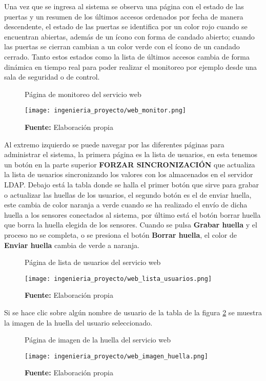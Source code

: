 \documentclass[../principal]{subfiles}
\begin{document}
  Una vez que se ingresa al sistema se observa una página con el estado de las puertas y un resumen de los últimos accesos ordenados por fecha de manera descendente, el estado de las puertas se identifica por un color rojo cuando se encuentran abiertas, además de un ícono con forma de candado abierto; cuando las puertas se cierran cambian a un color verde con el ícono de un candado cerrado. Tanto estos estados como la lista de últimos accesos cambia de forma dinámica en tiempo real para poder realizar el monitoreo por ejemplo desde una sala de seguridad o de control.

  \begin{figure}[H]
    \centering
    \caption{Página de monitoreo del servicio web}
    \texttt{[image: ingenieria\_proyecto/web\_monitor.png]}
    \caption*{\textbf{Fuente:} Elaboración propia}
    \label{fig:web_monitor}
  \end{figure}

  Al extremo izquierdo se puede navegar por las diferentes páginas para administrar el sistema, la primera página es la lista de usuarios, en esta tenemos un botón en la parte superior \textbf{FORZAR SINCRONIZACIÓN} que actualiza la lista de usuarios sincronizando los valores con los almacenados en el servidor LDAP. Debajo está la tabla donde se halla el primer botón que sirve para grabar o actualizar las huellas de los usuarios, el segundo botón es el de enviar huella, este cambia de color naranja a verde cuando se ha realizado el envío de dicha huella a los sensores conectados al sistema, por último está el botón borrar huella que borra la huella elegida de los sensores. Cuando se pulsa \textbf{Grabar huella} y el proceso no se completa, o se presiona el botón \textbf{Borrar huella}, el color de \textbf{Enviar huella} cambia de verde a naranja.

  \begin{figure}[H]
    \centering
    \caption{Página de lista de usuarios del servicio web}
    \texttt{[image: ingenieria\_proyecto/web\_lista\_usuarios.png]}
    \caption*{\textbf{Fuente:} Elaboración propia}
    \label{fig:web_lista_usuarios}
  \end{figure}

  Si se hace clic sobre algún nombre de usuario de la tabla de la figura \ref{fig:web_lista_usuarios} se muestra la imagen de la huella del usuario seleccionado.

  \begin{figure}[H]
    \centering
    \caption{Página de imagen de la huella del servicio web}
    \texttt{[image: ingenieria\_proyecto/web\_imagen\_huella.png]}
    \caption*{\textbf{Fuente:} Elaboración propia}
    \label{fig:web_imagen_huella}
  \end{figure}
\end{document}
